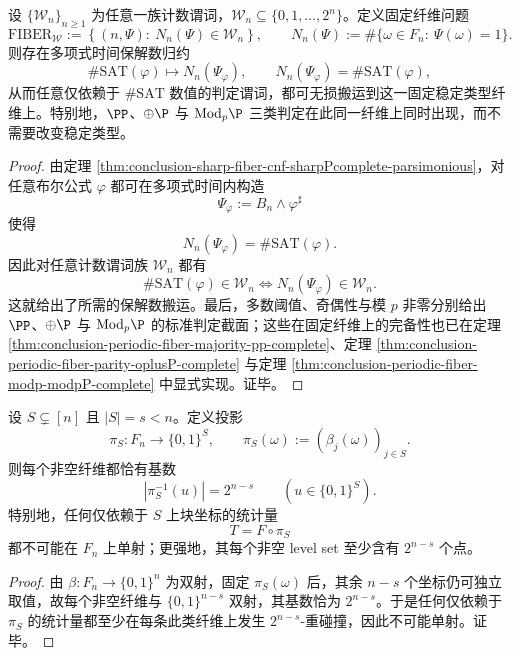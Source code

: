 \begin{corollary}[所有只依赖满足解个数的判定类都可塌缩到同一固定纤维]\label{cor:conclusion-period3-fiber-all-count-predicates-collapse}
设 \(\{\mathcal W_n\}_{n\ge 1}\) 为任意一族计数谓词，\(\mathcal W_n\subseteq\{0,1,\dots,2^n\}\)。定义固定纤维问题
\[
\mathrm{FIBER}_{\mathcal W}
:=
\left\{
(n,\Psi):\ N_n(\Psi)\in \mathcal W_n
\right\},
\qquad
N_n(\Psi):=\#\{\omega\in F_n:\ \Psi(\omega)=1\}.
\]
则存在多项式时间保解数归约
\[
\#\mathrm{SAT}(\varphi)\longmapsto N_n(\Psi_\varphi),
\qquad
N_n(\Psi_\varphi)=\#\mathrm{SAT}(\varphi),
\]
从而任意仅依赖于 \(\#\mathrm{SAT}\) 数值的判定谓词，都可无损搬运到这一固定稳定类型纤维上。特别地，\(\PP\)、\(\oplus\P\) 与 \(\mathrm{Mod}_p\P\) 三类判定在此同一纤维上同时出现，而不需要改变稳定类型。
\end{corollary}
\begin{proof}
由定理 \ref{thm:conclusion-sharp-fiber-cnf-sharpPcomplete-parsimonious}，对任意布尔公式 \(\varphi\) 都可在多项式时间内构造
\[
\Psi_\varphi:=B_n\wedge \varphi^\sharp
\]
使得
\[
N_n(\Psi_\varphi)=\#\mathrm{SAT}(\varphi).
\]
因此对任意计数谓词族 \(\mathcal W_n\) 都有
\[
\#\mathrm{SAT}(\varphi)\in \mathcal W_n
\iff
N_n(\Psi_\varphi)\in \mathcal W_n.
\]
这就给出了所需的保解数搬运。最后，多数阈值、奇偶性与模 \(p\) 非零分别给出 \(\PP\)、\(\oplus\P\) 与 \(\mathrm{Mod}_p\P\) 的标准判定截面；这些在固定纤维上的完备性也已在定理 \ref{thm:conclusion-periodic-fiber-majority-pp-complete}、定理 \ref{thm:conclusion-periodic-fiber-parity-oplusP-complete} 与定理 \ref{thm:conclusion-periodic-fiber-modp-modpP-complete} 中显式实现。证毕。
\end{proof}

\begin{proposition}\label{prop:conclusion-period3-fiber-subaxis-exponential-collision}
设 \(S\subsetneq[n]\) 且 \(|S|=s<n\)。定义投影
\[
\pi_S:F_n\to\{0,1\}^S,
\qquad
\pi_S(\omega):=(\beta_j(\omega))_{j\in S}.
\]
则每个非空纤维都恰有基数
\[
|\pi_S^{-1}(u)|=2^{n-s}
\qquad(u\in\{0,1\}^S).
\]
特别地，任何仅依赖于 \(S\) 上块坐标的统计量
\[
T=F\circ\pi_S
\]
都不可能在 \(F_n\) 上单射；更强地，其每个非空 level set 至少含有 \(2^{n-s}\) 个点。
\end{proposition}
\begin{proof}
由 \(\beta:F_n\to\{0,1\}^n\) 为双射，固定 \(\pi_S(\omega)\) 后，其余 \(n-s\) 个坐标仍可独立取值，故每个非空纤维与 \(\{0,1\}^{n-s}\) 双射，其基数恰为 \(2^{n-s}\)。于是任何仅依赖于 \(\pi_S\) 的统计量都至少在每条此类纤维上发生 \(2^{n-s}\)-重碰撞，因此不可能单射。证毕。
\end{proof}

